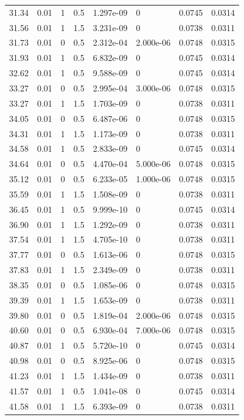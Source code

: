 \documentclass[preview]{standalone}
\begin{document}
{{{\begin{tabular}{L{1.2cm}C{1.2cm} C{0.3cm}C{0.5cm} C{1.4cm}C{1.4cm} C{1.4cm}C{1.4cm}}
  31.34  &  0.01  & 1     & 0.5 &  1.297e-09  & 0  & 0.0745 &  0.0314   \\ 
  31.56  &  0.01  & 1     & 1.5 &  3.231e-09  & 0  & 0.0738 &  0.0311   \\ 
  31.73  &  0.01  & 0     & 0.5 &  2.312e-04  & 2.000e-06  & 0.0748 &  0.0315   \\ 
  31.93  &  0.01  & 1     & 0.5 &  6.832e-09  & 0  & 0.0745 &  0.0314   \\ 
  32.62  &  0.01  & 1     & 0.5 &  9.588e-09  & 0  & 0.0745 &  0.0314   \\ 
  33.27  &  0.01  & 0     & 0.5 &  2.995e-04  & 3.000e-06  & 0.0748 &  0.0315   \\ 
  33.27  &  0.01  & 1     & 1.5 &  1.703e-09  & 0  & 0.0738 &  0.0311   \\ 
  34.05  &  0.01  & 0     & 0.5 &  6.487e-06  & 0  & 0.0748 &  0.0315   \\ 
  34.31  &  0.01  & 1     & 1.5 &  1.173e-09  & 0  & 0.0738 &  0.0311   \\ 
  34.58  &  0.01  & 1     & 0.5 &  2.833e-09  & 0  & 0.0745 &  0.0314   \\ 
  34.64  &  0.01  & 0     & 0.5 &  4.470e-04  & 5.000e-06  & 0.0748 &  0.0315   \\ 
  35.12  &  0.01  & 0     & 0.5 &  6.233e-05  & 1.000e-06  & 0.0748 &  0.0315   \\ 
  35.59  &  0.01  & 1     & 1.5 &  1.508e-09  & 0  & 0.0738 &  0.0311   \\ 
  36.45  &  0.01  & 1     & 0.5 &  9.999e-10  & 0  & 0.0745 &  0.0314   \\ 
  36.90  &  0.01  & 1     & 1.5 &  1.292e-09  & 0  & 0.0738 &  0.0311   \\ 
  37.54  &  0.01  & 1     & 1.5 &  4.705e-10  & 0  & 0.0738 &  0.0311   \\ 
  37.77  &  0.01  & 0     & 0.5 &  1.613e-06  & 0  & 0.0748 &  0.0315   \\ 
  37.83  &  0.01  & 1     & 1.5 &  2.349e-09  & 0  & 0.0738 &  0.0311   \\ 
  38.35  &  0.01  & 0     & 0.5 &  1.085e-06  & 0  & 0.0748 &  0.0315   \\ 
  39.39  &  0.01  & 1     & 1.5 &  1.653e-09  & 0  & 0.0738 &  0.0311   \\ 
  39.80  &  0.01  & 0     & 0.5 &  1.819e-04  & 2.000e-06  & 0.0748 &  0.0315   \\ 
  40.60  &  0.01  & 0     & 0.5 &  6.930e-04  & 7.000e-06  & 0.0748 &  0.0315   \\ 
  40.87  &  0.01  & 1     & 0.5 &  5.720e-10  & 0  & 0.0745 &  0.0314   \\ 
  40.98  &  0.01  & 0     & 0.5 &  8.925e-06  & 0  & 0.0748 &  0.0315   \\ 
  41.23  &  0.01  & 1     & 1.5 &  1.434e-09  & 0  & 0.0738 &  0.0311   \\ 
  41.57  &  0.01  & 1     & 0.5 &  1.041e-08  & 0  & 0.0745 &  0.0314   \\ 
  41.58  &  0.01  & 1     & 1.5 &  6.393e-09  & 0  & 0.0738 &  0.0311   \\ 
\hline 
\end{tabular} 

}}}
\end{document}

